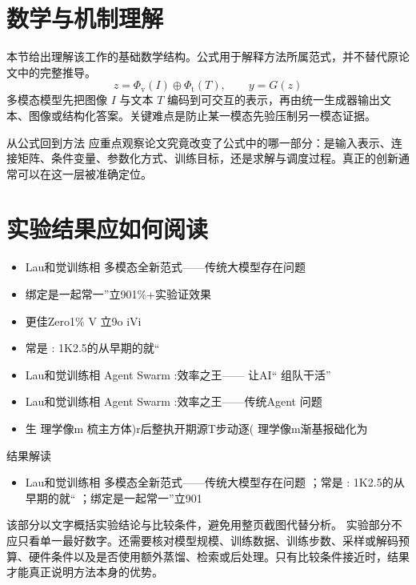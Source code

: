 \documentclass[UTF8,11pt,a4paper]{ctexart}
\begin{document}
\section{数学与机制理解}
本节给出理解该工作的基础数学结构。公式用于解释方法所属范式，并不替代原论文中的完整推导。
\begin{equation}
z=\Phi_{\mathrm v}(I)\oplus\Phi_{\mathrm t}(T),\qquad y=G(z)
\end{equation}
多模态模型先把图像 $I$ 与文本 $T$ 编码到可交互的表示，再由统一生成器输出文本、图像或结构化答案。关键难点是防止某一模态先验压制另一模态证据。

\begin{keybox}{从公式回到方法}
应重点观察论文究竟改变了公式中的哪一部分：是输入表示、连接矩阵、条件变量、参数化方式、训练目标，还是求解与调度过程。真正的创新通常可以在这一层被准确定位。
\end{keybox}


\section{实验结果应如何阅读}
\begin{itemize}
\item Lau和觉训练相 多模态全新范式——传统大模型存在问题
\item 绑定是一起常一”立901\%+实验证效果
\item 更佳Zero1\% V 立9o iVi
\item 常是 : 1K2.5的从早期的就“
\item Lau和觉训练相 Agent Swarm :效率之王—— 让AI“ 组队干活”
\item Lau和觉训练相 Agent Swarm :效率之王——传统Agent 问题
\item 生 理学像m 梳主方体)r后整执开期源T步动逐( 理学像m渐基报础化为
\end{itemize}

\begin{notebox}{结果解读}
\begin{itemize}
\item Lau和觉训练相 多模态全新范式——传统大模型存在问题 ；常是 : 1K2.5的从早期的就“ ；绑定是一起常一”立901\\%
\end{itemize}
\end{notebox}

该部分以文字概括实验结论与比较条件，避免用整页截图代替分析。
实验部分不应只看单一最好数字。还需要核对模型规模、训练数据、训练步数、采样或解码预算、硬件条件以及是否使用额外蒸馏、检索或后处理。只有比较条件接近时，结果才能真正说明方法本身的优势。
\end{document}
